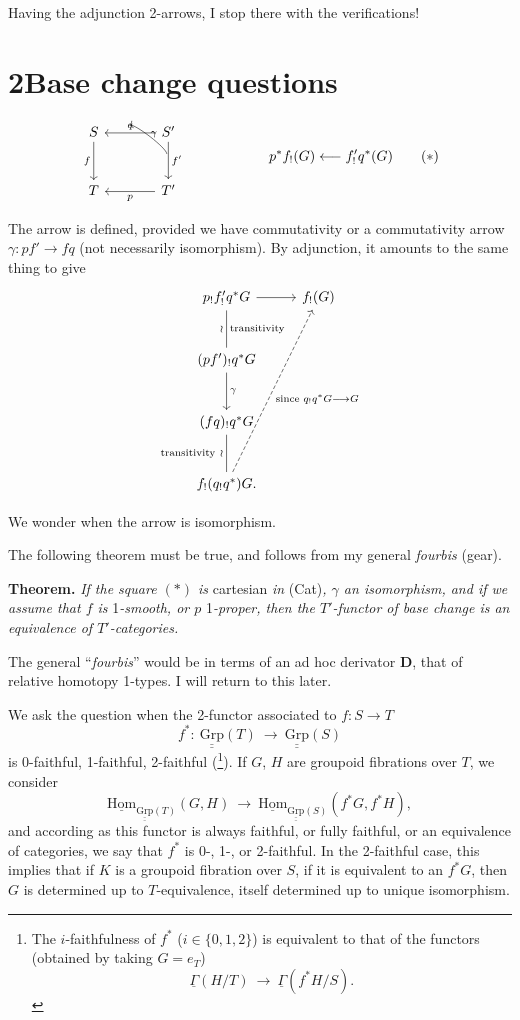 \documentclass[11pt]{article}
\newcommand{\printedpage}[1]{\marginpar{\footnotesize p.~#1}}
\newcommand{\msp}[1]{\marginpar{\footnotesize [#1]}}
\newcommand{\uHom}{\underline{\mathrm{Hom}}}
\newcommand{\uuGrp}{\underline{\underline{\mathrm{Grp}}}}
\newcommand{\fl}{\longrightarrow}
\begin{document}
Having the adjunction 2-arrows, I stop there with the verifications!

\printedpage{6}

\section*{2\quad Base change questions}

\[
\begin{tikzcd}[column sep=large, row sep=large]
S & S' \arrow[l, "q"'] \arrow[d, "f'"] \\
T \arrow[from=1-1, "f"'] & T' \arrow[l, "p"]
\arrow[from=2-2, to=1-1, bend right=50, shorten <=18pt, shorten >=18pt, "\gamma"']
\end{tikzcd}
\qquad\qquad\qquad
p^*f_!(G) \longleftarrow f'_!q^*(G)
\tag*{$(*)$}
\]

The arrow is defined, provided we have commutativity or a commutativity arrow $\gamma : pf' \fl fq$ (not necessarily isomorphism). By adjunction, it amounts to the same thing to give
\[
\begin{tikzcd}[row sep=large]
p_!f'_!q^*G \arrow[r] \arrow[d, dash, "\wr"', "\text{transitivity}"] & f_!(G) \\
(pf')_!q^*G \arrow[d, "\gamma"] & \\
(fq)_!q^*G \arrow[d, dash, "\text{transitivity}\ \wr"'] & \\
f_!(q_!q^*)G. \arrow[uuur, dashed, "\text{since } q_!q^*G \longrightarrow G"'] &
\end{tikzcd}
\]

We wonder when the arrow is isomorphism.

\msp{page 7}
The following theorem must be true, and follows from my general \textit{fourbis} (gear).

\textbf{Theorem.} \textit{If the square $(*)$ is} cartesian \textit{in} (Cat)\textit{, $\gamma$ an isomorphism, and if we assume that $f$ is} 1\textit{-smooth, or $p$} 1\textit{-proper, then the $T'$-functor of base change is an equivalence of $T'$-categories.}

The general ``\textit{fourbis}'' would be in terms of an ad hoc derivator $\mathbf{D}$, that of relative homotopy 1-types. I will return to this later.

We ask the question when the 2-functor associated to $f : S \fl T$
\[
f^* :\ \uuGrp(T) \ \fl\ \uuGrp(S)
\]
\printedpage{7}
is 0-faithful, 1-faithful, 2-faithful (\footnote[2]{The $i$-faithfulness of $f^*$ ($i \in \{0,1,2\}$) is equivalent to that of the functors (obtained by taking $G = e_T$)
\[
\underline{\Gamma}(H/T) \ \fl\ \underline{\Gamma}(f^*H/S).
\]}). If $G$, $H$ are groupoid fibrations over $T$, we consider
\[
\uHom_{\uuGrp(T)}(G,H) \ \fl\ \uHom_{\uuGrp(S)}(f^*G, f^*H),
\]
and according as this functor is always faithful, or fully faithful, or an equivalence of categories, we say that $f^*$ is 0-, 1-, or 2-faithful. In the 2-faithful case, this implies that if $K$ is a groupoid fibration over $S$, if it is equivalent to an $f^*G$, then $G$ is determined up to $T$-equivalence, itself determined up to unique isomorphism.
\end{document}
